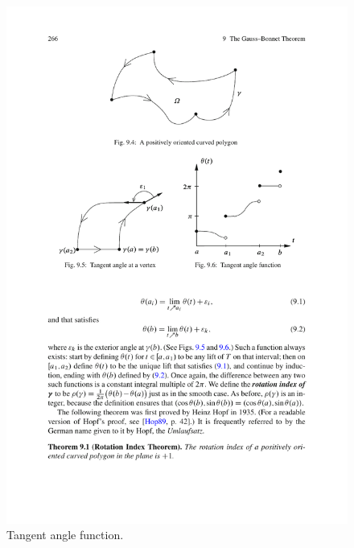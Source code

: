 \begin{figure}[htbp]
\begin{minipage}[b]{200pt}
\includegraphics{pictures/tangent-angle-function}
\caption{Tangent angle function.}
\end{minipage}
\end{figure}

